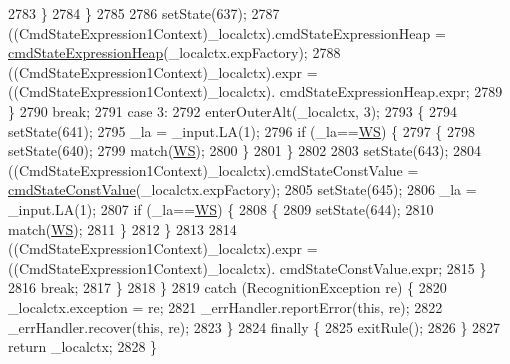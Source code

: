 \begin{DoxyCode}
2783           \}
2784         \}
2785 
2786         setState(637);
2787         ((CmdStateExpression1Context)\_localctx).cmdStateExpressionHeap = 
      \hyperlink{classgov_1_1nasa_1_1jpf_1_1inspector_1_1server_1_1expression_1_1parser_1_1_expression_grammar_parser_a5b90970e937c56fb82d43184d3d4d763}{cmdStateExpressionHeap}(\_localctx.expFactory);
2788          ((CmdStateExpression1Context)\_localctx).expr =  ((CmdStateExpression1Context)\_localctx).
      cmdStateExpressionHeap.expr; 
2789         \}
2790         \textcolor{keywordflow}{break};
2791       \textcolor{keywordflow}{case} 3:
2792         enterOuterAlt(\_localctx, 3);
2793         \{
2794         setState(641);
2795         \_la = \_input.LA(1);
2796         \textcolor{keywordflow}{if} (\_la==\hyperlink{classgov_1_1nasa_1_1jpf_1_1inspector_1_1server_1_1expression_1_1parser_1_1_expression_grammar_parser_ace44714ae633c7b14794cc5a24d9ebf3}{WS}) \{
2797           \{
2798           setState(640);
2799           match(\hyperlink{classgov_1_1nasa_1_1jpf_1_1inspector_1_1server_1_1expression_1_1parser_1_1_expression_grammar_parser_ace44714ae633c7b14794cc5a24d9ebf3}{WS});
2800           \}
2801         \}
2802 
2803         setState(643);
2804         ((CmdStateExpression1Context)\_localctx).cmdStateConstValue = 
      \hyperlink{classgov_1_1nasa_1_1jpf_1_1inspector_1_1server_1_1expression_1_1parser_1_1_expression_grammar_parser_a86b5c0db5219832726e50e8e4b168ac2}{cmdStateConstValue}(\_localctx.expFactory);
2805         setState(645);
2806         \_la = \_input.LA(1);
2807         \textcolor{keywordflow}{if} (\_la==\hyperlink{classgov_1_1nasa_1_1jpf_1_1inspector_1_1server_1_1expression_1_1parser_1_1_expression_grammar_parser_ace44714ae633c7b14794cc5a24d9ebf3}{WS}) \{
2808           \{
2809           setState(644);
2810           match(\hyperlink{classgov_1_1nasa_1_1jpf_1_1inspector_1_1server_1_1expression_1_1parser_1_1_expression_grammar_parser_ace44714ae633c7b14794cc5a24d9ebf3}{WS});
2811           \}
2812         \}
2813 
2814          ((CmdStateExpression1Context)\_localctx).expr =  ((CmdStateExpression1Context)\_localctx).
      cmdStateConstValue.expr; 
2815         \}
2816         \textcolor{keywordflow}{break};
2817       \}
2818     \}
2819     \textcolor{keywordflow}{catch} (RecognitionException re) \{
2820       \_localctx.exception = re;
2821       \_errHandler.reportError(\textcolor{keyword}{this}, re);
2822       \_errHandler.recover(\textcolor{keyword}{this}, re);
2823     \}
2824     \textcolor{keywordflow}{finally} \{
2825       exitRule();
2826     \}
2827     \textcolor{keywordflow}{return} \_localctx;
2828   \}
\end{DoxyCode}
